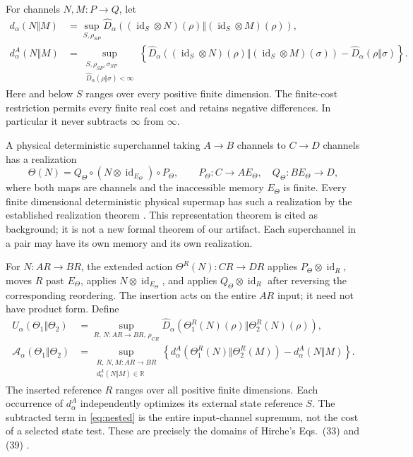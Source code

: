 \documentclass[11pt]{article}
\newcommand{\id}{\operatorname{id}}
\newcommand{\Dhat}{\widehat D}
\newcommand{\U}{U_\alpha}
\newcommand{\Adiv}{\mathcal A_\alpha}
\theoremstyle{remark}
\begin{document}
For channels $N,M:P\to Q$, let
\begin{align}
 d_\alpha(N\Vert M)
 &=\sup_{S,\rho_{SP}}\Dhat_\alpha((\id_S\otimes N)(\rho)\Vert
                                  (\id_S\otimes M)(\rho)),\label{eq:channel}\\
 d^A_\alpha(N\Vert M)
 &=\sup_{\substack{S,\rho_{SP},\sigma_{SP}\\
                    \Dhat_\alpha(\rho\Vert\sigma)<\infty}}
 \left\{\Dhat_\alpha((\id_S\otimes N)(\rho)\Vert
                     (\id_S\otimes M)(\sigma))
              -\Dhat_\alpha(\rho\Vert\sigma)\right\}.\label{eq:channelA}
\end{align}
Here and below $S$ ranges over every positive finite dimension. The
finite-cost restriction permits every finite real cost and retains negative
differences. In particular it never subtracts $\infty$ from $\infty$.

A physical deterministic superchannel taking $A\to B$ channels to $C\to D$
channels has a realization
\begin{equation}\label{eq:physical}
 \Theta(N)=Q_\Theta\circ(N\otimes\id_{E_\Theta})\circ P_\Theta,
 \qquad P_\Theta:C\to AE_\Theta,
 \quad Q_\Theta:BE_\Theta\to D,
\end{equation}
where both maps are channels and the inaccessible memory $E_\Theta$ is finite.
Every finite dimensional deterministic physical supermap has such a
realization by the established realization theorem
\cite[Theorem~1, Eq.~(23)]{CDP08}. This representation theorem is cited as
background; it is not a new formal theorem of our artifact. Each superchannel
in a pair may have its own memory and its own realization.

For $N:AR\to BR$, the extended action $\Theta^R(N):CR\to DR$ applies
$P_\Theta\otimes\id_R$, moves $R$ past $E_\Theta$, applies
$N\otimes\id_{E_\Theta}$, and applies $Q_\Theta\otimes\id_R$ after reversing
the corresponding reordering. The insertion acts on the entire $AR$ input;
it need not have product form. Define
\begin{align}
 \U(\Theta_1\Vert\Theta_2)
 &=\sup_{R,\,N:AR\to BR,\,\rho_{CR}}
   \Dhat_\alpha(\Theta_1^R(N)(\rho)\Vert\Theta_2^R(N)(\rho)),\label{eq:ordinary}\\
 \Adiv(\Theta_1\Vert\Theta_2)
 &=\sup_{\substack{R,\,N,M:AR\to BR\\d^A_\alpha(N\Vert M)\in\mathbb R}}
   \left\{d^A_\alpha(\Theta_1^R(N)\Vert\Theta_2^R(M))
                            -d^A_\alpha(N\Vert M)\right\}.\label{eq:nested}
\end{align}
The inserted reference $R$ ranges over all positive finite dimensions. Each
occurrence of $d^A_\alpha$ independently optimizes its external state reference
$S$. The subtracted term in \eqref{eq:nested} is the entire input-channel
supremum, not the cost of a selected state test. These are precisely the
domains of Hirche's Eqs.~(33) and (39) \cite{Hir23}.
\end{document}
